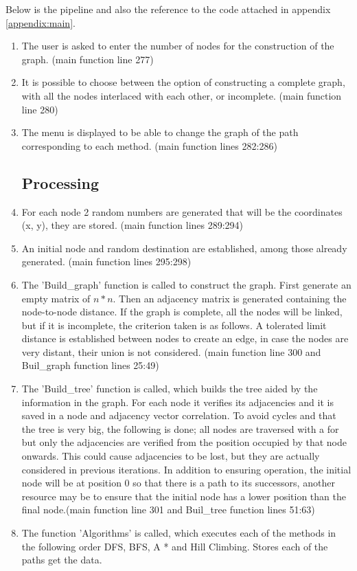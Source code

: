 \documentclass[12pt]{article}
\begin{document}
Below is the pipeline and also the reference to the code attached in appendix \ref{appendix:main}.
\begin{enumerate}
    \subsection{Input}
    \item The user is asked to enter the number of nodes for the construction of the graph. (main function line 277)
    \item It is possible to choose between the option of constructing a complete graph, with all the nodes interlaced with each other, or incomplete. (main function line 280)
    \item The menu is displayed to be able to change the graph of the path corresponding to each method. (main function lines 282:286)
    \subsection{Processing}
    \item For each node 2 random numbers are generated that will be the coordinates (x, y), they are stored. (main function lines 289:294)
    \item An initial node and random destination are established, among those already generated. (main function lines 295:298)
    \item The 'Build\_graph' function is called to construct the graph. First generate an empty matrix of $n*n$. Then an adjacency matrix is generated containing the node-to-node distance. If the graph is complete, all the nodes will be linked, but if it is incomplete, the criterion taken is as follows. A tolerated limit distance is established between nodes to create an edge, in case the nodes are very distant, their union is not considered. (main function line 300 and Buil\_graph function lines 25:49)
    \item The 'Build\_tree' function is called, which builds the tree aided by the information in the graph. For each node it verifies its adjacencies and it is saved in a node and adjacency vector correlation. To avoid cycles and that the tree is very big, the following is done; all nodes are traversed with a for but only the adjacencies are verified from the position occupied by that node onwards. This could cause adjacencies to be lost, but they are actually considered in previous iterations. In addition to ensuring operation, the initial node will be at position 0 so that there is a path to its successors, another resource may be to ensure that the initial node has a lower position than the final node.(main function line 301 and Buil\_tree function lines 51:63)
    \item The function 'Algorithms' is called, which executes each of the methods in the following order DFS, BFS, A * and Hill Climbing. Stores each of the paths get the data. 

\end{enumerate}
\end{document}
